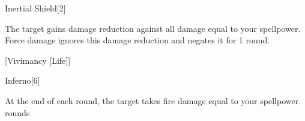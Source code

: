 \begin{spellsection}{Inertial Shield}[2]
    \begin{spellheader}
    \end{spellheader}
    \begin{spellcontent}
        \begin{spelltargetinginfo}
        \end{spelltargetinginfo}
        \begin{spelleffects}
            \spelleffect The target gains damage reduction against all damage equal to your spellpower.
            Force damage ignores this damage reduction and negates it for 1 round.
            \spelldur \durshort
        \end{spelleffects}
    \end{spellcontent}
    \begin{spellfooter}
        \miscastexplode
    \end{spellfooter}
    \begin{spellaugments}
        [Vivimancy [Life]]
    \end{spellaugments}
\end{spellsection}

\begin{spellsection}{Inferno}[6]
    \begin{spellheader}
    \end{spellheader}
    \begin{spellcontent}
        \begin{spelltargetinginfo}
        \end{spelltargetinginfo}
        \begin{spelleffects}
            \spelleffect At the end of each round, the target takes fire damage equal to your spellpower.
             rounds
        \end{spelleffects}
    \end{spellcontent}
    \begin{spellfooter}
        \miscastexplode
    \end{spellfooter}
    \begin{spellaugments}
    \end{spellaugments}
\end{spellsection}

